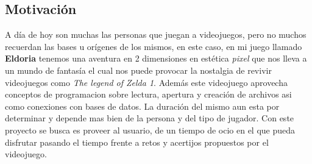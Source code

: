 \documentclass[a4paper]{article}
\begin{document}
\subsection{Motivación}
A día de hoy son muchas las personas que juegan a videojuegos, pero no muchos recuerdan las bases u orígenes de los mismos, en este caso, en mi juego llamado
\textbf{Eldoria} tenemos una aventura en 2 dimensiones en estética \textit{pixel} que nos lleva a un mundo de fantasía el cual nos puede provocar la nostalgia de revivir
videojuegos como \textit{The legend of Zelda 1}. Además este videojuego aprovecha conceptos de programacion sobre lectura, apertura y creación de archivos asi como
conexiones con bases de datos. La duración del mismo aun esta por determinar y depende mas bien de la persona y del tipo de jugador. Con este proyecto se busca
es proveer al usuario, de un tiempo de ocio en el que pueda disfrutar pasando el tiempo frente a retos y acertijos propuestos por el videojuego.
\end{document}
